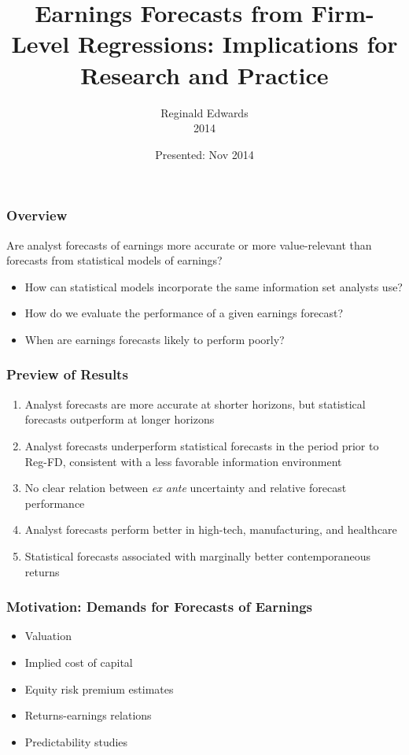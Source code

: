 \documentclass{beamer}
\title[Earnings Forecasts from Firm-Level Regressions: Implications for Research and Practice]{Earnings Forecasts from Firm-Level Regressions: Implications for Research and Practice}
\author[Reginald Edwards]{Reginald Edwards\\2014}
\date[Nov 2014]{Presented: Nov 2014}
\begin{document}
\begin{frame}
\titlepage
\end{frame}

\begin{frame}
\frametitle{Overview}
Are analyst forecasts of earnings more accurate or more value-relevant than forecasts from statistical models of earnings?
\begin{itemize}
\item How can statistical models incorporate the same information set analysts use?
\item How do we evaluate the performance of a given earnings forecast?
\item When are earnings forecasts likely to perform poorly?
\end{itemize}
\end{frame}

\begin{frame}
\frametitle{Preview of Results}
\begin{enumerate}
\item Analyst forecasts are more accurate at shorter horizons, but statistical forecasts outperform at longer horizons
\item Analyst forecasts underperform statistical forecasts in the period prior to Reg-FD, consistent with a less favorable information environment
\item No clear relation between \emph{ex ante} uncertainty and relative forecast performance
\item Analyst forecasts perform better in high-tech, manufacturing, and healthcare
\item Statistical forecasts associated with marginally better contemporaneous returns
\end{enumerate}
\end{frame}

\begin{frame}
\frametitle{Motivation: Demands for Forecasts of Earnings}
\begin{itemize}
\item Valuation
\item Implied cost of capital
\item Equity risk premium estimates
\item Returns-earnings relations
\item Predictability studies
\end{itemize}
\end{frame}
\end{document}
